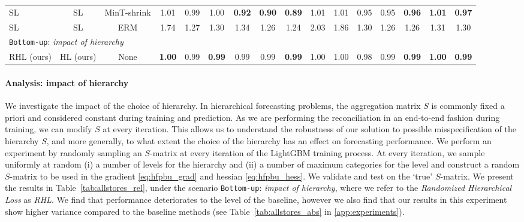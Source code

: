 \documentclass[preprint, 3p, times, twocolumn]{elsarticle}
\begin{document}
\begin{table}
\begin{center}
{\begin{tabular}{l c  cccccccccccccc}
    \hspace{0.1cm} 	SL	&SL	&MinT-shrink	&1.01	&0.99	&1.00	&\textbf{0.92} &\textbf{0.90}	&\textbf{0.89}	&1.01	&1.01	&0.95	&0.95	&\textbf{0.96}	&\textbf{1.01}	&\textbf{0.97}	\\
    \hspace{0.1cm} 	SL	&SL	&ERM	&1.74	&1.27	&1.30	&1.34	&1.26	&1.24	&2.03	&1.86	&1.30	&1.26	&1.26	&1.31	&1.30	\\    
    \midrule
    \midrule
    \multicolumn{4}{l}{\texttt{Bottom-up}: \textit{impact of hierarchy}}																	\\
    \hspace{0.1cm} 	RHL (ours)	&HL (ours)	&None	&\textbf{1.00}	&0.99	&\textbf{0.99}	&0.99	&0.99	&\textbf{0.99}	&1.00	&1.00	&0.98	&0.99	&\textbf{0.99}	&\textbf{1.00}	&\textbf{0.99}	\\
    \bottomrule
    \end{tabular}}
    \end{center}
    \end{table}

  \paragraph{Analysis: impact of hierarchy} We investigate the impact of the choice of hierarchy. In hierarchical forecasting problems, the aggregation matrix \(S\) is commonly fixed a priori and considered constant during training and prediction. As we are performing the reconciliation in an end-to-end fashion during training, we can modify \(S\) at every iteration. This allows us to understand the robustness of our solution to possible misspecification of the hierarchy \(S\), and more generally, to what extent the choice of the hierarchy has an effect on forecasting performance. We perform an experiment by randomly sampling an \(S\)-matrix at every iteration of the LightGBM training process. At every iteration, we sample uniformly at random (i) a number of levels for the hierarchy and (ii) a number of maximum categories for the level and construct a random \(S\)-matrix to be used in the gradient \eqref{eq:hfpbu_grad} and hessian \eqref{eq:hfpbu_hess}. We validate and test on the `true' \(S\)-matrix. We present the results in Table~\ref{tab:allstores_rel}, under the scenario \texttt{Bottom-up}: \textit{impact of hierarchy}, where we refer to the \textit{Randomized Hierarchical Loss} as \textit{RHL}. We find that performance deteriorates to the level of the baseline, however we also find that our results in this experiment show higher variance compared to the baseline methods (see Table~\ref{tab:allstores_abs} in \ref{app:experiments}). 
\end{document}
